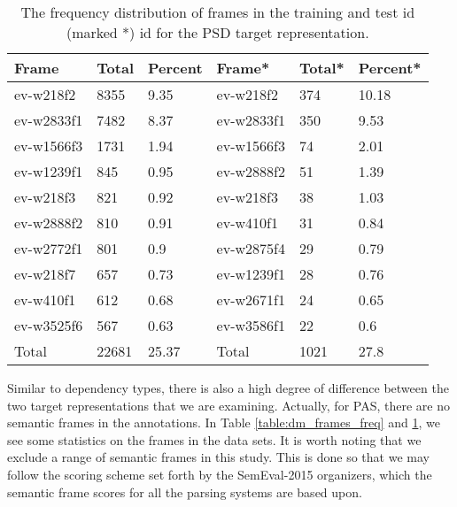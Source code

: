 \begin{table}
    \centering
    \smaller[0.7]
    \begin{tabular}{@{}llllll@{}}
        \toprule
        \textbf{Frame} & \textbf{Total} & \textbf{Percent} & \textbf{Frame*} & \textbf{Total*} & \textbf{Percent*} \\
        \midrule
        ev-w218f2 & 8355 & 9.35 & ev-w218f2 & 374 & 10.18 \\
        ev-w2833f1 & 7482 & 8.37 & ev-w2833f1 & 350 & 9.53 \\
        ev-w1566f3 & 1731 & 1.94 & ev-w1566f3 & 74 & 2.01 \\
        ev-w1239f1 & 845 & 0.95 & ev-w2888f2 & 51 & 1.39 \\
        ev-w218f3 & 821 & 0.92 & ev-w218f3 & 38 & 1.03 \\
        ev-w2888f2 & 810 & 0.91 & ev-w410f1 & 31 & 0.84 \\
        ev-w2772f1 & 801 & 0.9 & ev-w2875f4 & 29 & 0.79 \\
        ev-w218f7 & 657 & 0.73 & ev-w1239f1 & 28 & 0.76 \\
        ev-w410f1 & 612 & 0.68 & ev-w2671f1 & 24 & 0.65 \\
        ev-w3525f6 & 567 & 0.63 & ev-w3586f1 & 22 & 0.6 \\
        \midrule
        Total & 22681 & 25.37  & Total & 1021 & 27.8 \\
        \bottomrule
    \end{tabular}
    \caption{The frequency distribution of frames in the training and test id (marked *) id for the PSD target representation.}
    \label{table:psd_frames_freq}
\end{table}

Similar to dependency types, there is also a high degree of difference between the two target representations that we are examining. Actually, for PAS, there are no semantic frames in the annotations.  In Table \ref{table:dm_frames_freq} and \ref{table:psd_frames_freq}, we see some statistics on the frames in the data sets. It is worth noting that we exclude a range of semantic frames in this study. This is done so that we may follow the scoring scheme set forth by the SemEval-2015 organizers, which the semantic frame scores for all the parsing systems are based upon.

